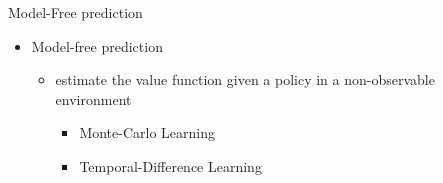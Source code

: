 \bgroup
\begin{frame}{Model-Free prediction}
\begin{itemize}
\item \textcolor{mImagelabRed}{Model-free prediction}
\begin{itemize}
\item estimate the value function given a policy in a non-observable environment
\begin{itemize}
\item Monte-Carlo Learning
\item Temporal-Difference Learning
\end{itemize}
\end{itemize}
\end{itemize}
\end{frame}
\egroup